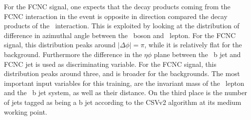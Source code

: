    
   For the FCNC signal, one expects that the decay products coming from the FCNC interaction in the event is opposite in direction compared the decay products of the \SM\ interaction. This is exploited by looking at the distribution of difference in azimuthal angle between the  \PZ\ boson and  \PW\ lepton. For the FCNC signal, this distribution peaks around $|\Delta\phi|=\pi$, while it is relatively flat for the background. Furthermore the difference in the $\eta\phi$ plane between the \SM\ b jet and FCNC jet is used as discriminating variable. For the FCNC signal, this distribution peaks around three, and is broader for the backgrounds.  The most important input variables for this training, are the invariant mass of the \PW\ lepton and the \SM\ b jet system, as well as their distance. On the third place is the number of jets tagged as being a b jet according to the CSVv2 algorithm at its medium working point. 
